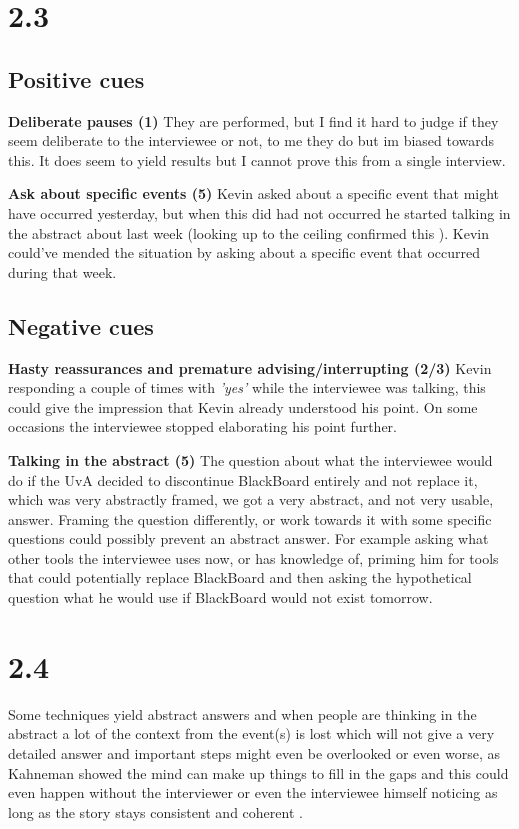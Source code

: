 \section*{2.3}

\subsection*{Positive cues}
\textbf{Deliberate pauses (1)} They are performed, but I find it hard to judge if they seem deliberate to the interviewee or not, to me they do but im biased towards this. It does seem to yield results but I cannot prove this from a single interview.

\textbf{Ask about specific events (5)} Kevin asked about a specific event that might have occurred yesterday, but when this did had not occurred he started talking in the abstract about last week (looking up to the ceiling confirmed this \cite{apprenticing}). Kevin could've mended the situation by asking about a specific event that occurred during that week.

\subsection*{Negative cues}
\textbf{Hasty reassurances and premature advising/interrupting (2/3)} Kevin responding a couple of times with \emph{'yes'} while the interviewee was talking, this could give the impression that Kevin already understood his point. On some occasions the interviewee stopped elaborating his point further.

\textbf{Talking in the abstract (5)} The question about what the interviewee would do if the UvA decided to discontinue BlackBoard entirely and not replace it, which was very abstractly framed, we got a very abstract, and not very usable, answer. Framing the question differently, or work towards it with some specific questions could possibly prevent an abstract answer. For example asking what other tools the interviewee uses now, or has knowledge of, priming him for tools that could potentially replace BlackBoard and then asking the hypothetical question what he would use if BlackBoard would not exist tomorrow.

\section*{2.4}

Some techniques yield abstract answers and when people are thinking in the abstract a lot of the context from the event(s) is lost which will not give a very detailed answer and important steps might even be overlooked \cite{apprenticing} or even worse, as Kahneman showed the mind can make up things to fill in the gaps and this could even happen without the interviewer or even the interviewee himself noticing as long as the story stays consistent and coherent \cite{kahneman}.


